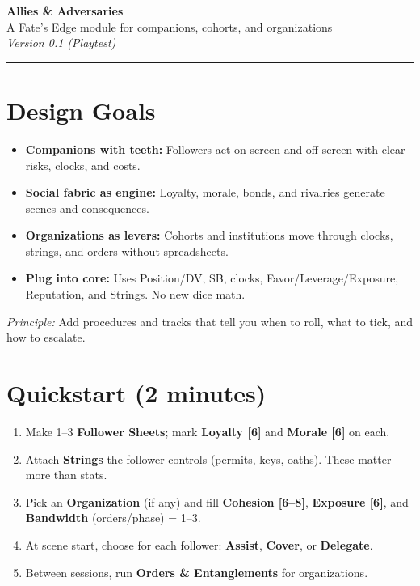 

\begin{center}
{\LARGE \textbf{Allies \& Adversaries}}\\[3pt]
{\large A Fate's Edge module for companions, cohorts, and organizations}\\[2pt]
\textit{Version 0.1 (Playtest)}
\end{center}
\vspace{0.25em}
\hrule\vspace{0.75em}

\section*{Design Goals}
\begin{itemize}
  \item \textbf{Companions with teeth:} Followers act on-screen and off-screen with clear risks, clocks, and costs.
  \item \textbf{Social fabric as engine:} Loyalty, morale, bonds, and rivalries generate scenes and consequences.
  \item \textbf{Organizations as levers:} Cohorts and institutions move through clocks, strings, and orders without spreadsheets.
  \item \textbf{Plug into core:} Uses Position/DV, SB, clocks, Favor/Leverage/Exposure, Reputation, and Strings. No new dice math.
\end{itemize}
\emph{Principle:} Add procedures and tracks that tell you when to roll, what to tick, and how to escalate.

\section*{Quickstart (2 minutes)}
\begin{enumerate}
  \item Make 1--3 \textbf{Follower Sheets}; mark \textbf{Loyalty [6]} and \textbf{Morale [6]} on each.
  \item Attach \textbf{Strings} the follower controls (permits, keys, oaths). These matter more than stats.
  \item Pick an \textbf{Organization} (if any) and fill \textbf{Cohesion [6--8]}, \textbf{Exposure [6]}, and \textbf{Bandwidth} (orders/phase) = 1--3.
  \item At scene start, choose for each follower: \textbf{Assist}, \textbf{Cover}, or \textbf{Delegate}.
  \item Between sessions, run \textbf{Orders \& Entanglements} for organizations.
\end{enumerate}

